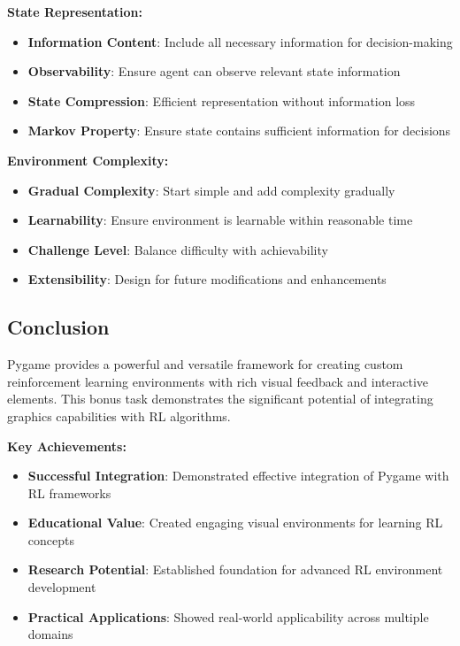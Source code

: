 \documentclass[12pt]{article}
\begin{document}
{{{\textbf{State Representation:}
\begin{itemize}
    \item \textbf{Information Content}: Include all necessary information for decision-making
    \item \textbf{Observability}: Ensure agent can observe relevant state information
    \item \textbf{State Compression}: Efficient representation without information loss
    \item \textbf{Markov Property}: Ensure state contains sufficient information for decisions
\end{itemize}

\textbf{Environment Complexity:}
\begin{itemize}
    \item \textbf{Gradual Complexity}: Start simple and add complexity gradually
    \item \textbf{Learnability}: Ensure environment is learnable within reasonable time
    \item \textbf{Challenge Level}: Balance difficulty with achievability
    \item \textbf{Extensibility}: Design for future modifications and enhancements
\end{itemize}

\subsection{Conclusion}

Pygame provides a powerful and versatile framework for creating custom reinforcement learning environments with rich visual feedback and interactive elements. This bonus task demonstrates the significant potential of integrating graphics capabilities with RL algorithms.

\textbf{Key Achievements:}
\begin{itemize}
    \item \textbf{Successful Integration}: Demonstrated effective integration of Pygame with RL frameworks
    \item \textbf{Educational Value}: Created engaging visual environments for learning RL concepts
    \item \textbf{Research Potential}: Established foundation for advanced RL environment development
    \item \textbf{Practical Applications}: Showed real-world applicability across multiple domains
\end{itemize}

}}}
\end{document}
